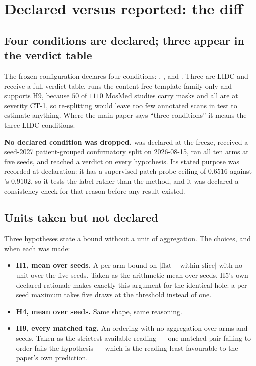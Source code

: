 \documentclass[10pt]{article}
\begin{document}
\section{Declared versus reported: the diff}

\subsection{Four conditions are declared; three appear in the verdict table}

The frozen configuration declares four conditions: \condA{}, \condB{}, \condC{}
and \condD{}. Three are LIDC and receive a full verdict table. \condD{} runs the
content-free template family only and supports H9, because $50$ of $1110$ MosMed
studies carry masks and all are at severity CT-1, so re-splitting would leave too
few annotated scans in test to estimate anything. Where the main paper says
``three conditions'' it means the three LIDC conditions.

\textbf{No declared condition was dropped.} \condB{} was declared at the freeze,
received a seed-2027 patient-grouped confirmatory split on 2026-08-15, ran all
ten arms at five seeds, and reached a verdict on every hypothesis. Its stated
purpose was recorded at declaration: it has a supervised patch-probe ceiling of
$0.6516$ against \condA{}'s $0.9102$, so it tests the label rather than the
method, and it was declared a consistency check for that reason before any
result existed.

\subsection{Units taken but not declared}

Three hypotheses state a bound without a unit of aggregation. The choices, and
when each was made:

\begin{itemize}\itemsep2pt
\item \textbf{H1, mean over seeds.} A per-arm bound on
$|{\text{flat}}-{\text{within-slice}}|$ with no unit over the five seeds. Taken
as the arithmetic mean over seeds. H5's own declared rationale makes exactly this
argument for the identical hole: a per-seed maximum takes five draws at the
threshold instead of one.
\item \textbf{H4, mean over seeds.} Same shape, same reasoning.
\item \textbf{H9, every matched tag.} An ordering with no aggregation over arms
and seeds. Taken as the strictest available reading --- one matched pair failing
to order fails the hypothesis --- which is the reading least favourable to the
paper's own prediction.
\end{itemize}
\end{document}
